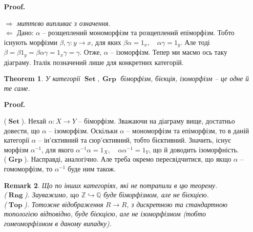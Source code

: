 \documentclass[a4paper, 10pt]{article}
\makeatletter
\def\rightproof{$\boxed{\Rightarrow}$ }
\def\leftproof{$\boxed{\Leftarrow}$ }
\theoremstyle{theoremdd}
\newtheorem{theorem}{Theorem}[subsection]
\newtheorem{remark}[theorem]{Remark}
\renewenvironment{proof}[1][Proof.\\]{\par
\pushQED{\hfill \qed}%
\normalfont \topsep6\p@\@plus6\p@\relax
\trivlist
\item\relax
{\bfseries
#1\@addpunct{.}}\hspace\labelsep\ignorespaces
}{%
\popQED\endtrivlist\@endpefalse
}
\DeclareMathOperator{\Set}{\textbf{Set}}
\DeclareMathOperator{\Grp}{\textbf{Grp}}
\DeclareMathOperator{\Rng}{\textbf{Rng}}
\DeclareMathOperator{\Top}{\textbf{Top}}
\makeatother
\begin{document}
\begin{proof}
\rightproof \textit{миттєво випливає з означення.}
\bigskip \\
\leftproof Дано: $\alpha$ -- розщеплений мономорфізм та розщеплений епіморфізм. Тобто існують морфізми $\beta, \gamma \colon y \to x$, для яких $\beta \alpha = 1_x, \quad \alpha \gamma = 1_y$. Але тоді $\beta = \beta 1_y = \beta \alpha \gamma = 1_x \gamma = \gamma$. Отже, $\alpha$ -- ізоморфізм.
\end{proof}
\noindent Тепер ми маємо ось таку діаграму. Італік позначений лише для конкретних категорій.
\begin{figure}[H]
\centering
{}
\end{figure}

\begin{theorem}
У категорії $\Set, \Grp$ біморфізм, бієкція, ізоморфізм -- це одне й те саме.
\end{theorem}

\begin{proof}
($\Set$). Нехай $\alpha \colon X \to Y$ -- біморфізм. Зважаючи на діаграму вище, достатньо довести, що $\alpha$ -- ізоморфізм. Оскільки $\alpha$ -- мономорфізм та епіморфізм, то в даній категорії $\alpha$ -- ін'єктивний та сюр'єктивний, тобто бієктивний. Значить, існує морфізм $\alpha^{-1}$, для якого $\alpha^{-1} \alpha = 1_X, \quad \alpha \alpha^{-1} = 1_Y$, що й доводить ізоморфність.
\bigskip \\
($\Grp$). Насправді, аналогічно. Але треба окремо пересвідчитися, що якщо $\alpha$ -- гомоморфізм, то $\alpha^{-1}$ буде ним також.
\end{proof}

\begin{remark}
Що по інших категоріях, які не потрапили в цю теорему.\\
($\Rng$). Зауважимо, що $\mathbb{Z} \hookrightarrow \mathbb{Q}$ буде біморфізмом, але не бієкцією.\\
($\Top$). Тотожне відображення $R \to R$, з дискретною та стандартною топологією відповідно, буде бієкцією, але не ізоморфізмом (тобто гомеоморфізмом в даному випадку).
\end{remark}
\end{document}
